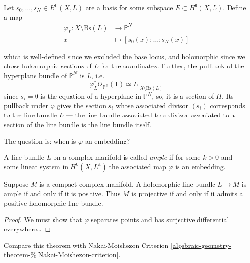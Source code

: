 \documentclass{book}
\begin{document}
Let $s_0,\ldots,s_N\in H^{0}(X,L)$ are a
basis
for some subspace $E \subset H^0(X,L)$.
Define a map
$$
\begin{aligned}
\varphi_L: X\setminus\text{Bs}(L)
&\longrightarrow \mathbb{P}^N \\
x &\longmapsto [s_0(x):\ldots:s_N(x)]
\end{aligned}
$$

\noindent
which is well-defined since we excluded
the base locus,
and holomorphic since we chose holomorphic
sections of $L$ for the coordinates.
Further, the pullback of the hyperplane
bundle of $\mathbb{P}^N$ is $L$,
i.e.
$$
\varphi^*_L \mathcal{O}_{\mathbb{P}^N}(1)
\simeq L|_{X\setminus\text{Bs}(L)}
$$
since $s_i=0$ is the equation of a hyperplane
in $\mathbb{P}^N$,
so, it is a section of $H$.
Its pullback under $\varphi$ gives the
section $s_i$
whose associated divisor $(s_i)$
corresponds to the line bundle $L$ ---
the line bundle associated to a divisor
associated to a section of the line bundle
is the line bundle itself.

\medskip\noindent
The question is: when is $\varphi$ an
embedding?

\begin{definition}
\label{definition-ample}
\begin{reference}
\cite[Definition 2.3.28]{huc}
\end{reference}
A line bundle $L$ on a complex manifold is
called {\it ample} if for some $k>0$
and some linear system in $H^{0}(X,L^k)$ the
associated map $\varphi$ is an
embedding.
\end{definition}

\begin{theorem}
\label{theorem-Kodaira-embedding}
\begin{reference}
\cite[Theorem 10.12]{lec}
\end{reference}
Suppose $M$ is a compact complex manifold.
A holomorphic line bundle $L\to M$ is
ample if and only if it is positive.
Thus $M$ is projective if and only if it
admits a positive holomorphic line bundle.
\end{theorem}

\begin{proof}
We must show that $\varphi$ separates points
and has
surjective differential everywhere…
\end{proof}

\noindent
Compare this theorem with Nakai-Moishezon
Criterion
\ref{algebraic-geometry-theorem-%
Nakai-Moishezon-criterion}.
\end{document}
